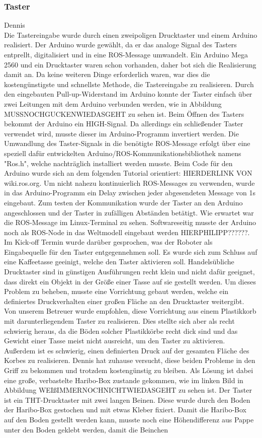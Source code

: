 \documentclass[a4paper,12pt,headsepline]{scrartcl}
\begin{document}
	\subsubsection{Taster}
		Dennis\\
	Die Tastereingabe wurde durch einen zweipoligen Drucktaster und einem Arduino realisiert. Der Arduino wurde gewählt, da er das analoge Signal des Tasters entprellt, digitalisiert und in eine ROS-Message umwandelt. Ein Arduino Mega 2560 und ein Drucktaster waren schon vorhanden, daher bot sich die Realisierung damit an. Da keine weiteren Dinge erforderlich waren, war dies die kostengünstigste und schnellste Methode, die Tastereingabe zu realisieren. Durch den eingebauten Pull-up-Widerstand im Arduino konnte der Taster einfach über zwei Leitungen mit dem Arduino verbunden werden, wie in Abbildung {MUSSNOCHGUCKENWIEDASGEHT} zu sehen ist. Beim Öffnen des Tasters bekommt der Arduino ein HIGH-Signal. Da allerdings ein schließender Taster verwendet wird, musste dieser im Arduino-Programm invertiert werden. Die Umwandlung des Taster-Signals in die benötigte ROS-Message erfolgt über eine speziell dafür entwickelten Arduino/ROS-Kommunikationsbibliothek namens "Ros.h", welche nachträglich installiert werden musste. Beim Code für den Arduino wurde sich an dem folgenden Tutorial orientiert: {HIERDERLINK VON wiki.ros.org}. Um nicht nahezu kontinuierlich ROS-Messages zu verwenden, wurde in das Arduino-Programm ein Delay zwischen jeder abgesendeten Message von 1s eingebaut. Zum testen der Kommunikation wurde der Taster an den Arduino angeschlossen und der Taster in zufälligen Abständen betätigt. Wie erwartet war die ROS-Message im Linux-Terminal zu sehen. Softwareseitig musste der Arduino noch als ROS-Node in das Weltmodell eingebaut werden {HIERPHILIPP??????}. Im Kick-off Termin wurde darüber gesprochen, was der Roboter als Eingabequelle für den Taster entgegennehmen soll. Es wurde sich zum Schluss auf eine Kaffeetasse geeinigt, welche den Taster aktivieren soll. Handelsübliche Drucktaster sind in günstigen Ausführungen recht klein und nicht dafür geeignet, dass direkt ein Objekt in der Größe einer Tasse auf sie gestellt werden. Um dieses Problem zu beheben, musste eine Vorrichtung gebaut werden, welche ein definiertes Druckverhalten einer großen Fläche an den Drucktaster weitergibt. Von unserem Betreuer wurde empfohlen, diese Vorrichtung aus einem Plastikkorb mit darunterliegendem Taster zu realisieren. Dies stellte sich aber als recht schwierig heraus, da die Böden solcher Plastikkörbe recht dick sind und das Gewicht einer Tasse meist nicht ausreicht, um den Taster zu aktivieren. Außerdem ist es schwierig, einen definierten Druck auf der gesamten Fläche des Korbes zu realisieren. Dennis hat zuhause versucht, diese beiden Probleme in den Griff zu bekommen und trotzdem kostengünstig zu bleiben. Als Lösung ist dabei eine große, verbastelte Haribo-Box zustande gekommen, wie im linken Bild in Abbildung {WEIßIMMERNOCHNICHTWIEDASGEHT} zu sehen ist. Der Taster ist ein THT-Drucktaster mit zwei langen Beinen. Diese wurde durch den Boden der Haribo-Box gestochen und mit etwas Kleber fixiert. Damit die Haribo-Box auf den Boden gestellt werden kann, musste noch eine Höhendifferenz aus Pappe unter den Boden geklebt werden, damit die Beinchen 
\end{document}
